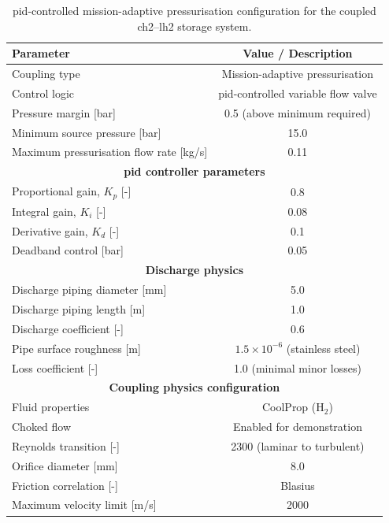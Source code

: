 \begin{table}[H]
\centering
\caption{\gls{pid}-controlled mission-adaptive pressurisation configuration for the coupled \gls{ch2}--\gls{lh2} storage system.}
\label{tab:ch2-lh2-coupling}
\begin{tabular}{@{}lc@{}}
\toprule
\textbf{Parameter} & \textbf{Value / Description} \\ \midrule
Coupling type & Mission-adaptive pressurisation \\
Control logic & \gls{pid}-controlled variable flow valve \\
Pressure margin [bar] & 0.5 (above minimum required) \\
Minimum source pressure [bar] & 15.0 \\
Maximum pressurisation flow rate [kg/s] & 0.11 \\ \midrule
\multicolumn{2}{c}{\textbf{\gls{pid} controller parameters}} \\ \midrule
Proportional gain, $K_p$ [-] & 0.8 \\
Integral gain, $K_i$ [-] & 0.08 \\
Derivative gain, $K_d$ [-] & 0.1 \\
Deadband control [bar] & 0.05 \\ \midrule
\multicolumn{2}{c}{\textbf{Discharge physics}} \\ \midrule
Discharge piping diameter [mm] & 5.0 \\
Discharge piping length [m] & 1.0 \\
Discharge coefficient [-] & 0.6 \\
Pipe surface roughness [m] & $1.5 \times 10^{-6}$ (stainless steel) \\
Loss coefficient [-] & 1.0 (minimal minor losses) \\ \midrule
\multicolumn{2}{c}{\textbf{Coupling physics configuration}} \\ \midrule
Fluid properties & CoolProp (H$_2$) \\
Choked flow & Enabled for demonstration \\
Reynolds transition [-] & 2300 (laminar to turbulent) \\
Orifice diameter [mm] & 8.0 \\
Friction correlation [-] & Blasius \cite{blasius} \\
Maximum velocity limit [m/s] & 2000 \\ \bottomrule
\end{tabular}
\end{table}

